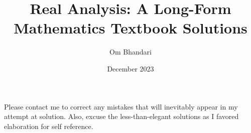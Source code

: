 \documentclass{article}
\title{Real Analysis: A Long-Form Mathematics Textbook Solutions}
\author{Om Bhandari}
\date{December 2023}
\begin{document}
\maketitle
Please contact me to correct any mistakes that will inevitably appear in my attempt at solution. Also, excuse the 
less-than-elegant solutions as I favored elaboration for self reference. 





\end{document}

